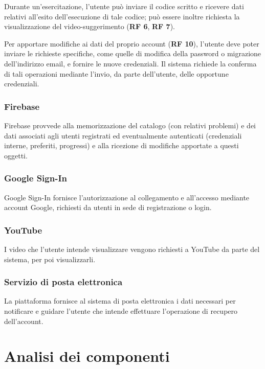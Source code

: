 \documentclass[11pt, a4paper]{article}
\theoremstyle{definition} %
\begin{document}
Durante un'esercitazione, l'utente può inviare il codice scritto e ricevere dati
relativi all'esito dell'esecuzione di tale codice; può essere inoltre richiesta la
visualizzazione del video-suggerimento (\textbf{RF 6}, \textbf{RF 7}).

Per apportare modifiche ai dati del proprio account (\textbf{RF 10}), l'utente
deve poter inviare le richieste specifiche, come quelle di modifica della password
o migrazione dell'indirizzo email, e fornire le nuove credenziali. Il
sistema richiede la conferma di tali operazioni mediante l'invio, da parte
dell'utente, delle opportune credenziali.

\subsubsection*{Firebase}
Firebase provvede alla memorizzazione del catalogo (con relativi problemi) e dei
dati associati agli utenti registrati ed eventualmente autenticati (credenziali
interne, preferiti, progressi) e alla ricezione di modifiche apportate a questi oggetti.

\subsubsection*{Google Sign-In}
Google Sign-In fornisce l'autorizzazione al collegamento e all'accesso
mediante account Google, richiesti da utenti in sede di registrazione o
login.

\subsubsection*{YouTube}
I video che l'utente intende visualizzare vengono richiesti a YouTube da
parte del sistema, per poi visualizzarli.

\subsubsection*{Servizio di posta elettronica}
La piattaforma fornisce al sistema di posta elettronica i dati necessari
per notificare e guidare l'utente che intende effettuare l'operazione di
recupero dell'account.



\newpage
\section{Analisi dei componenti}
\end{document}
